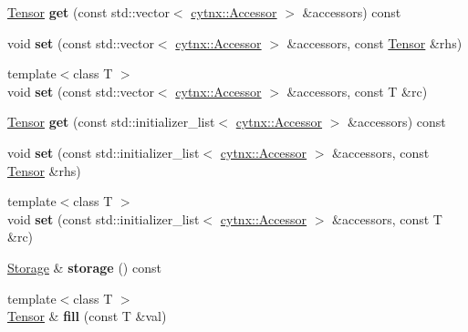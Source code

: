 \begin{DoxyCompactItemize}
\hyperlink{classcytnx_1_1Tensor}{Tensor} {\bfseries get} (const std\+::vector$<$ \hyperlink{classcytnx_1_1Accessor}{cytnx\+::\+Accessor} $>$ \&accessors) const
\item 
\mbox{\label{classcytnx_1_1Tensor_a771f1f5b51f89abd8df4166e602214ac}} 
void {\bfseries set} (const std\+::vector$<$ \hyperlink{classcytnx_1_1Accessor}{cytnx\+::\+Accessor} $>$ \&accessors, const \hyperlink{classcytnx_1_1Tensor}{Tensor} \&rhs)
\item 
\mbox{\label{classcytnx_1_1Tensor_ad93d654b978add6b2f0dfb9f91490209}} 
{\footnotesize template$<$class T $>$ }\\void {\bfseries set} (const std\+::vector$<$ \hyperlink{classcytnx_1_1Accessor}{cytnx\+::\+Accessor} $>$ \&accessors, const T \&rc)
\item 
\mbox{\label{classcytnx_1_1Tensor_ac32f5b8921f39924abb2036ee1877884}} 
\hyperlink{classcytnx_1_1Tensor}{Tensor} {\bfseries get} (const std\+::initializer\+\_\+list$<$ \hyperlink{classcytnx_1_1Accessor}{cytnx\+::\+Accessor} $>$ \&accessors) const
\item 
\mbox{\label{classcytnx_1_1Tensor_a666a2352ca3b632cb8569e5013b50058}} 
void {\bfseries set} (const std\+::initializer\+\_\+list$<$ \hyperlink{classcytnx_1_1Accessor}{cytnx\+::\+Accessor} $>$ \&accessors, const \hyperlink{classcytnx_1_1Tensor}{Tensor} \&rhs)
\item 
\mbox{\label{classcytnx_1_1Tensor_ac04c49c32bd11a66f192ad77b5710e0a}} 
{\footnotesize template$<$class T $>$ }\\void {\bfseries set} (const std\+::initializer\+\_\+list$<$ \hyperlink{classcytnx_1_1Accessor}{cytnx\+::\+Accessor} $>$ \&accessors, const T \&rc)
\item 
\mbox{\label{classcytnx_1_1Tensor_a0fd5918a0f64ebd74fe34cb8b8164c30}} 
\hyperlink{classcytnx_1_1Storage}{Storage} \& {\bfseries storage} () const
\item 
\mbox{\label{classcytnx_1_1Tensor_a674d9dd01d4b523117cf96561de93401}} 
{\footnotesize template$<$class T $>$ }\\\hyperlink{classcytnx_1_1Tensor}{Tensor} \& {\bfseries fill} (const T \&val)

\end{DoxyCompactItemize}
